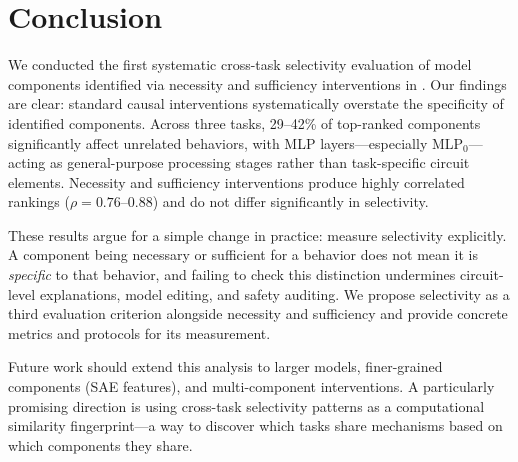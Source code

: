 \section{Conclusion}
\label{sec:conclusion}

We conducted the first systematic cross-task selectivity evaluation of model components identified via necessity and sufficiency interventions in \gptsmall. Our findings are clear: standard causal interventions systematically overstate the specificity of identified components. Across three tasks, 29--42\% of top-ranked components significantly affect unrelated behaviors, with MLP layers---especially MLP$_0$---acting as general-purpose processing stages rather than task-specific circuit elements. Necessity and sufficiency interventions produce highly correlated rankings ($\rho = 0.76$--$0.88$) and do not differ significantly in selectivity.

These results argue for a simple change in practice: measure selectivity explicitly. A component being necessary or sufficient for a behavior does not mean it is \emph{specific} to that behavior, and failing to check this distinction undermines circuit-level explanations, model editing, and safety auditing. We propose selectivity as a third evaluation criterion alongside necessity and sufficiency and provide concrete metrics and protocols for its measurement.

Future work should extend this analysis to larger models, finer-grained components (\eg SAE features), and multi-component interventions. A particularly promising direction is using cross-task selectivity patterns as a computational similarity fingerprint---a way to discover which tasks share mechanisms based on which components they share.